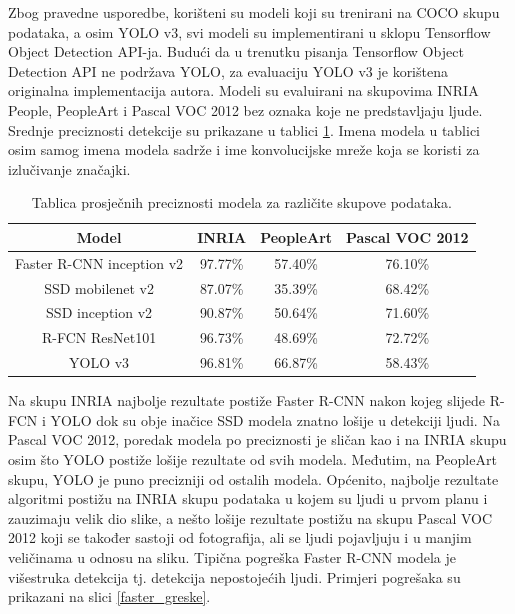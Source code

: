 Zbog pravedne usporedbe, korišteni su modeli koji su trenirani na COCO skupu podataka, a osim YOLO v3, svi modeli su implementirani u sklopu Tensorflow Object Detection API-ja. Budući da u trenutku pisanja Tensorflow Object Detection API ne podržava YOLO, za evaluaciju YOLO v3 je korištena originalna implementacija autora. Modeli su evaluirani na skupovima INRIA People, PeopleArt i Pascal VOC 2012 bez oznaka koje ne predstavljaju ljude. Srednje preciznosti detekcije su prikazane u tablici \ref{tablica_preciznosti}. Imena modela u tablici osim samog imena modela sadrže i ime konvolucijske mreže koja se koristi za izlučivanje značajki.

\begin{table}[h]
	\begin{center}
	\begin{tabular}{| c | c | c | c |}
		\hline
		Model & INRIA & PeopleArt & Pascal VOC 2012 \\ \hline
		Faster R-CNN inception v2 & 97.77\% & 57.40\% & 76.10\% \\ \hline
		SSD mobilenet v2 & 87.07\% & 35.39\% & 68.42\% \\ \hline
		SSD inception v2 & 90.87\% & 50.64\% & 71.60\% \\ \hline
		R-FCN ResNet101 & 96.73\% & 48.69\% & 72.72\% \\ \hline
		YOLO v3 & 96.81\% & 66.87\% & 58.43\%  \\ \hline 
	\end{tabular}

	\caption{Tablica prosječnih preciznosti modela za različite skupove podataka.}
	\label{tablica_preciznosti}
	\end{center}
\end{table}

Na skupu INRIA najbolje rezultate postiže Faster R-CNN nakon kojeg slijede R-FCN i YOLO dok su obje inačice SSD modela znatno lošije u detekciji ljudi. Na Pascal VOC 2012, poredak modela po preciznosti je sličan kao i na INRIA skupu osim što YOLO postiže lošije rezultate od svih modela. Međutim, na PeopleArt skupu, YOLO je puno precizniji od ostalih modela.
Općenito, najbolje rezultate algoritmi postižu na INRIA skupu podataka u kojem su ljudi u prvom planu i zauzimaju velik dio slike, a nešto lošije rezultate postižu na skupu Pascal VOC 2012 koji se također sastoji od fotografija, ali se ljudi pojavljuju i u manjim veličinama u odnosu na sliku.
Tipična pogreška Faster R-CNN modela je višestruka detekcija tj. detekcija nepostojećih ljudi. Primjeri pogrešaka su prikazani na slici \ref{faster_greske}.

